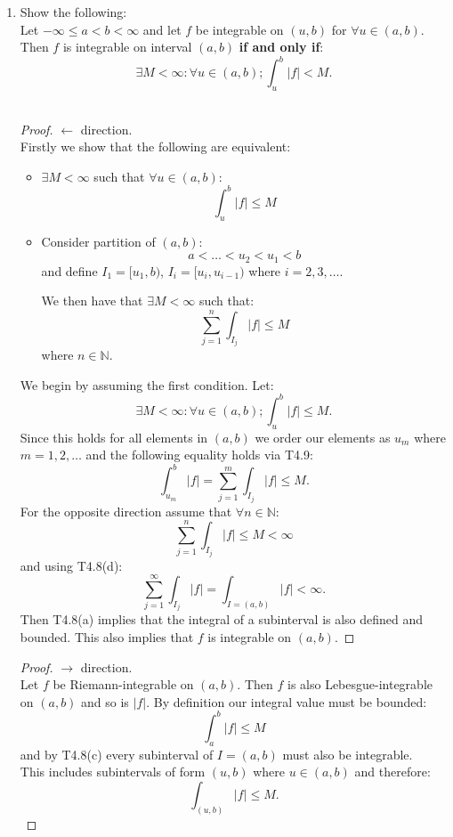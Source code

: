 \begin{enumerate}[resume]
    \item Show the following: \\
    Let $-\infty\leq a<b<\infty$ and let
    $f$ be integrable on $(u,b)$ for $\forall u\in(a,b)$. \\
    Then $f$ is integrable on interval $(a,b)$ \textbf{if and only if}:
    $$\exists M<\infty:\forall u\in(a,b);\int_{u}^{b}|f|<M.$$ \\

    \begin{proof}
        $\leftarrow$ direction. \\
        Firstly we show that the following are equivalent:
        \begin{itemize}
            \item $\exists M<\infty$ such that $\forall u\in(a,b)$:
            $$\int_{u}^{b}|f|\leq M$$
    
            \item Consider partition of $(a,b)$:
            $$a<\dots<u_2<u_1<b$$
            and define $I_1=[u_1,b)$, $I_i=[u_i, u_{i-1})$
            where $i=2,3,\dots$.
    
            We then have that $\exists M<\infty$ such that:
            $$\sum_{j=1}^{n}\int_{I_j}|f|\leq M$$
            where $n\in\mathbb{N}$.
        \end{itemize}
        We begin by assuming the first condition. Let:
        $$\exists M<\infty:\forall u\in(a,b);
        \int_{u}^{b}|f|\leq M.$$
        Since this holds for all elements in $(a,b)$ we
        order our elements as $u_m$ where $m=1,2,\dots$
        and the following equality holds via T4.9:
        $$\int_{u_m}^{b}|f|=\sum_{j=1}^{m}\int_{I_j}|f|\leq M.$$
        For the opposite direction assume that
        $\forall n\in\mathbb{N}$:
        $$\sum_{j=1}^{n}
        \int_{I_j}|f|\leq M<\infty$$
        and using T4.8(d):
        $$\sum_{j=1}^{\infty}\int_{I_j}|f|
        =\int_{I=(a,b)}|f|<\infty.$$
        Then T4.8(a) implies that the integral of a subinterval
        is also defined and bounded.
        This also implies that
        $f$ is integrable on $(a,b)$.
    \end{proof}

    \newpage

    \begin{proof}
        $\rightarrow$ direction. \\
        Let $f$ be Riemann-integrable on $(a,b)$. Then $f$
        is also Lebesgue-integrable on $(a,b)$ and so is $|f|$.
        By definition our integral value must be bounded:
        $$\int_{a}^{b}|f|\leq M$$
        and by T4.8(c) every subinterval of $I=(a,b)$ must also
        be integrable. \\
        This includes subintervals of form $(u,b)$ where
        $u\in(a,b)$ and therefore:
        $$\int_{(u,b)}|f|\leq M.$$
    \end{proof}


\end{enumerate}
